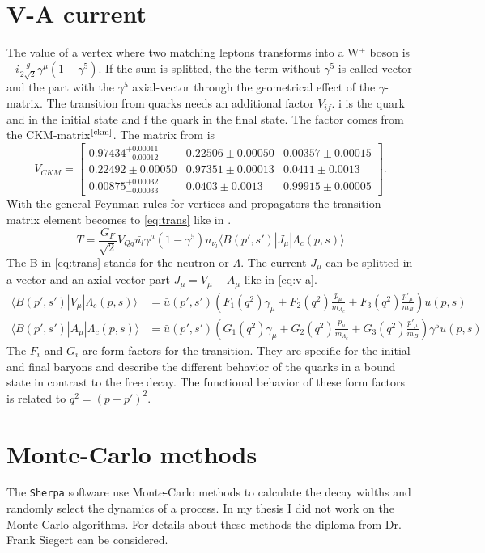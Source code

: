 \section{V-A current} \label{sec:v-a}
The value of a vertex where two matching leptons transforms into a  
W\(^\pm\) boson is \(-i \frac{g}{2\sqrt{2}} \gamma^\mu\left(1-\gamma^5\right)\).
If the sum is splitted, the the term without \(\gamma^5\) is called vector and 
the part with the \(\gamma^5\) axial-vector through the geometrical effect of 
the \(\gamma\)-matrix. The transition from quarks needs an additional factor 
\(V_{if}\). i is the quark and in the initial state and f the quark in the 
final state. The factor comes from the CKM-matrix\(^{\text{\cite{ckm}}}\). The 
matrix from {\cite{ckm}} is
\begin{equation}
  V_{CKM} =
  \begin{bmatrix}
    0.97434^{+0.00011}_{-0.00012} &  0.22506 \pm 0.00050 & 0.00357 \pm 0.00015 \\
    0.22492 \pm 0.00050 & 0.97351 \pm 0.00013 & 0.0411 \pm 0.0013 \\
    0.00875^{+0.00032}_{-0.00033} & 0.0403 \pm 0.0013 & 0.99915 \pm 0.00005
  \end{bmatrix}. \label{eq:ckm}
\end{equation}
With the general Feynman rules for vertices and propagators the transition matrix 
element becomes to {\eqref{eq:trans}} like in {\cite[Eq. 1]{Frank}}.
\begin{equation}
  T = \frac{G_F}{\sqrt{2}} V_{Qq} \bar{u_l}\gamma^\mu\left(1 - \gamma^5\right) 
  u_{\nu_l} \langle B(p', s') | J_\mu | \Lambda_c(p, s) \rangle \label{eq:trans}
\end{equation}
The B in {\eqref{eq:trans}} stands for the neutron or \(\Lambda\). The current 
\(J_\mu\) can be splitted in a vector and an axial-vector part \(J_\mu = V_\mu - 
A_\mu \) like in {\eqref{eq:v-a}}.
\begin{align}
  \langle B(p', s') | V_\mu | \Lambda_c(p, s) \rangle & = \bar{u}(p', s') 
  \left( F_1(q^2) \gamma_\mu + F_2(q^2)\frac{p_\mu}{m_{\Lambda_c}} + 
  F_3(q^2)\frac{p'_\mu}{m_B} \right) u(p, s) \nonumber \\
  \langle B(p', s') | A_\mu | \Lambda_c(p, s) \rangle & = \bar{u}(p', s') 
  \left( G_1(q^2) \gamma_\mu + G_2(q^2)\frac{p_\mu}{m_{\Lambda_c}} + 
  G_3(q^2)\frac{p'_\mu}{m_B} \right) \gamma^5 u(p, s) \label{eq:v-a}
\end{align}
The \(F_i\) and \(G_i\) are form factors for the transition. They are specific 
for the initial and final baryons and describe the different behavior of the 
quarks in a bound state in contrast to the free decay. The functional behavior 
of these form factors is related to \(q^2 = (p - p')^2\).

\section{Monte-Carlo methods}
The \texttt{Sherpa} software use Monte-Carlo methods to calculate the decay
widths and  randomly select the dynamics of a process. In my thesis I did 
not work on the Monte-Carlo algorithms. For details about these methods 
the diploma{\cite{diploma}} from Dr. Frank Siegert can be considered.

